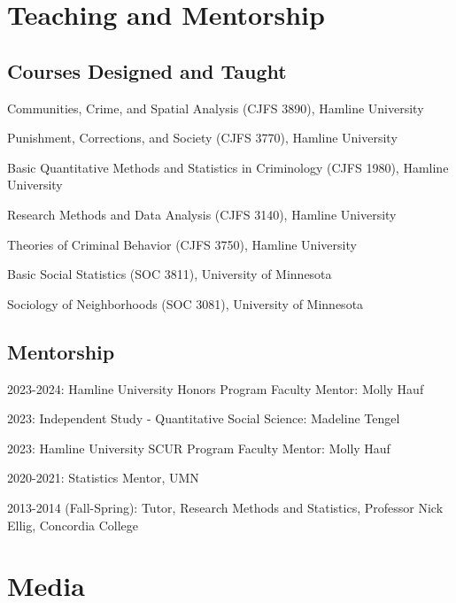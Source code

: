 \documentclass[letterpaper]{article}
\renewenvironment{itemize}{
  \begin{list}{}{
    \setlength{\leftmargin}{1.5em}
  }
}{
  \end{list}
}
\begin{document}
\section*{\textbf{Teaching and Mentorship}}

\subsection*{Courses Designed and Taught}


\begin{itemize} 

\item Communities, Crime, and Spatial Analysis (CJFS 3890), Hamline University
\item Punishment, Corrections, and Society (CJFS 3770), Hamline University
\item Basic Quantitative Methods and Statistics in Criminology (CJFS 1980), Hamline University
\item Research Methods and Data Analysis (CJFS 3140), Hamline University
\item Theories of Criminal Behavior (CJFS 3750), Hamline University
\item Basic Social Statistics (SOC 3811), University of Minnesota
\item Sociology of Neighborhoods (SOC 3081), University of Minnesota

\end{itemize}


\subsection*{Mentorship}
        \begin{itemize}

\item 2023-2024: Hamline University Honors Program Faculty Mentor: Molly Hauf
\item 2023: Independent Study - Quantitative Social Science: Madeline Tengel 
\item 2023: Hamline University SCUR Program Faculty Mentor: Molly Hauf
\item 2020-2021: Statistics Mentor, UMN
    

\item 2013-2014 (Fall-Spring): Tutor, Research Methods and Statistics, Professor Nick Ellig, Concordia College
         \end{itemize}

\section*{\textbf{Media}}
\end{document}

